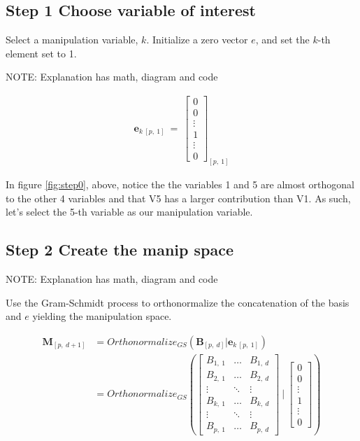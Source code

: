 \documentclass{monashthesis}
\begin{document}
\subsection{Step 1 Choose variable of
interest}\label{step-1-choose-variable-of-interest}

Select a manipulation variable, \(k\). Initialize a zero vector \(e\),
and set the \(k\)-th element set to 1.

NOTE: Explanation has math, diagram and code

\begin{align*}
\textbf{e}_{k~[p,~1]} ~=~ 
  \begin{bmatrix}
    0 \\
    0 \\
    \vdots \\
    1 \\
    \vdots \\
    0
  \end{bmatrix}_{[p,~1]}
\end{align*}

In figure \ref{fig:step0}, above, notice the the variables 1 and 5 are
almost orthogonal to the other 4 variables and that V5 has a larger
contribution than V1. As such, let's select the 5-th variable as our
manipulation variable.

\subsection{Step 2 Create the manip
space}\label{step-2-create-the-manip-space}

NOTE: Explanation has math, diagram and code

Use the Gram-Schmidt process to orthonormalize the concatenation of the
basis and \(e\) yielding the manipulation space.

\begin{align*}
  \textbf{M}_{[p,~d+1]}
  &= Orthonormalize_{GS}( \textbf{B}_{[p,~d]}|\textbf{e}_{k~[p,~1]} ) \\
  &= Orthonormalize_{GS}
  \left(
    \begin{bmatrix}
      B_{1,~1} & \dots  & B_{1,~d} \\
      B_{2,~1} & \dots  & B_{2,~d} \\
      \vdots   & \ddots & \vdots   \\
      B_{k,~1} & \dots  & B_{k,~d} \\
      \vdots   & \ddots & \vdots   \\
      B_{p,~1} & \dots  & B_{p,~d}
    \end{bmatrix}
  ~|~
    \begin{bmatrix}
      0 \\
      0 \\
      \vdots \\
      1 \\
      \vdots \\
      0
    \end{bmatrix}
  \right)
\end{align*}
\end{document}
